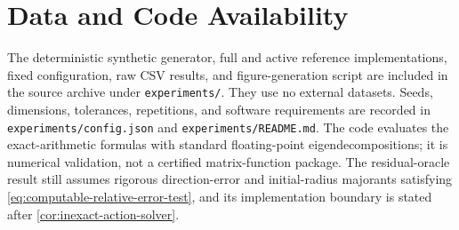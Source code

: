 \section*{Data and Code Availability}

The deterministic synthetic generator, full and active reference
implementations, fixed configuration, raw CSV results, and figure-generation
script are included in the source archive under \texttt{experiments/}.  They
use no external datasets.  Seeds, dimensions, tolerances, repetitions, and
software requirements are recorded in \texttt{experiments/config.json} and
\texttt{experiments/README.md}.  The code evaluates the exact-arithmetic
formulas with standard floating-point eigendecompositions; it is numerical
validation, not a certified matrix-function package.  The residual-oracle
result still assumes rigorous direction-error and initial-radius majorants
satisfying \cref{eq:computable-relative-error-test}, and its implementation
boundary is stated after \cref{cor:inexact-action-solver}.
